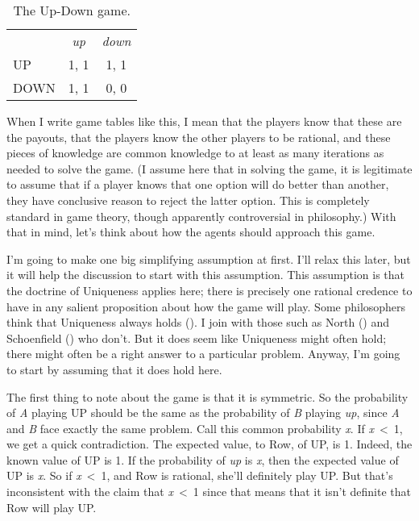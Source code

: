 \documentclass[
  12pt,
  letterpaper,
]{scrbook}
\begin{document}
\begin{longtable}[]{@{}lcc@{}}
\caption{The Up-Down game.}\label{tbl-up-down}\tabularnewline
\toprule\noalign{}
\endfirsthead
\endhead
\bottomrule\noalign{}
\endlastfoot
& \emph{up} & \emph{down} \\
UP & 1, 1 & 1, 1 \\
DOWN & 1, 1 & 0, 0 \\
\end{longtable}

When I write game tables like this, I mean that the players know that
these are the payouts, that the players know the other players to be
rational, and these pieces of knowledge are common knowledge to at least
as many iterations as needed to solve the game. (I assume here that in
solving the game, it is legitimate to assume that if a player knows that
one option will do better than another, they have conclusive reason to
reject the latter option. This is completely standard in game theory,
though apparently controversial in philosophy.) With that in mind, let's
think about how the agents should approach this game.

I'm going to make one big simplifying assumption at first. I'll relax
this later, but it will help the discussion to start with this
assumption. This assumption is that the doctrine of Uniqueness applies
here; there is precisely one rational credence to have in any salient
proposition about how the game will play. Some philosophers think that
Uniqueness always holds (). I
join with those such as North () and
Schoenfield () who don't. But it
does seem like Uniqueness might often hold; there might often be a right
answer to a particular problem. Anyway, I'm going to start by assuming
that it does hold here.

The first thing to note about the game is that it is symmetric. So the
probability of \emph{A} playing UP should be the same as the probability
of \emph{B} playing \emph{up}, since \emph{A} and \emph{B} face exactly
the same problem. Call this common probability \emph{x}. If
\emph{x}~\textless~1, we get a quick contradiction. The expected value,
to Row, of UP, is 1. Indeed, the known value of UP is 1. If the
probability of \emph{up} is \emph{x}, then the expected value of UP is
\emph{x}. So if \emph{x}~\textless~1, and Row is rational, she'll
definitely play UP. But that's inconsistent with the claim that
\emph{x}~\textless~1 since that means that it isn't definite that Row
will play UP.
\end{document}
